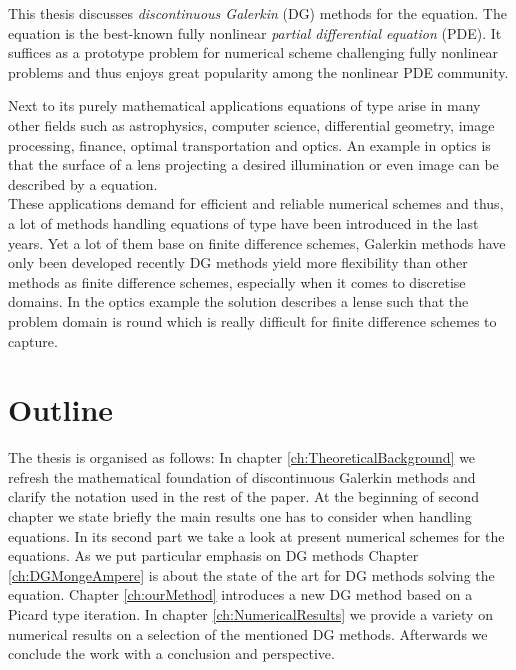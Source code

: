 This thesis discusses \emph{discontinuous Galerkin} (DG) methods for the \MA equation. 
The \MA equation is the best-known fully nonlinear \emph{partial differential equation} (PDE). It suffices as a prototype problem for numerical scheme challenging fully nonlinear problems and thus enjoys great popularity among the nonlinear PDE community.

Next to its purely mathematical applications equations of \MA type arise in many other fields such as astrophysics, computer science, differential geometry, image processing, finance, optimal transportation and optics\cite{FGN2013}. 
An example in optics is that the surface of a lens projecting a desired illumination or even image can be described by a \MA equation\cite{KW2010, BHP2014}. \\
These applications demand for efficient and reliable numerical schemes and thus, a lot of methods handling equations of \MA type have been introduced in the last years. Yet a lot of them base on finite difference schemes, Galerkin methods have only been developed recently \cite{Boehmer2008, FN2009a, Awanou2010, BGN+2011, Neilan2014} DG methods yield more flexibility than other methods as finite difference schemes, especially when it comes to discretise domains. In the optics example the solution describes a lense such that the problem domain is round which is really difficult for finite difference schemes to capture.

\section*{Outline}
The thesis is organised as follows: In chapter \ref{ch:TheoreticalBackground} we refresh the mathematical foundation of discontinuous Galerkin methods and clarify the notation used in the rest of the paper.
At the beginning of second chapter we state briefly the main results one has to consider when handling \MA equations. In its second part we take a look at present numerical schemes for the \MA equations. As we put particular emphasis on DG methods Chapter \ref{ch:DGMongeAmpere} is about the state of the art for DG methods solving the \MA equation.
Chapter \ref{ch:ourMethod} introduces a new DG method based on a Picard type iteration. In chapter \ref{ch:NumericalResults} we provide a variety on numerical results on a selection of the mentioned DG methods.
Afterwards we conclude the work with a conclusion and perspective.